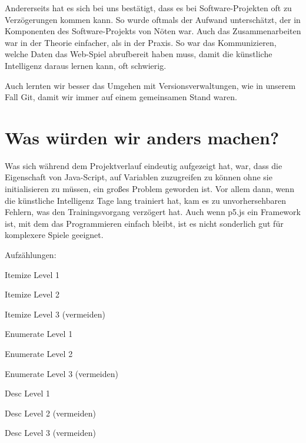 Andererseits hat es sich bei uns bestätigt, dass es bei Software-Projekten oft zu Verzögerungen kommen kann.
So wurde oftmals der Aufwand unterschätzt, der in Komponenten des Software-Projekts von Nöten war. 
Auch das Zusammenarbeiten war in der Theorie einfacher, als in der Praxis. So war das Kommunizieren, welche Daten das Web-Spiel abrufbereit haben muss, damit die künstliche Intelligenz daraus lernen kann, oft schwierig.

Auch lernten wir besser das Umgehen mit Versionsverwaltungen, wie in unserem Fall Git, damit wir immer auf einem gemeinsamen Stand waren.

\section{Was würden wir anders machen?}
Was sich während dem Projektverlauf eindeutig aufgezeigt hat, war, dass die Eigenschaft von Java-Script, auf Variablen zuzugreifen zu können ohne sie initialisieren zu müssen, ein großes Problem geworden ist.
Vor allem dann, wenn die künstliche Intelligenz Tage lang trainiert hat, kam es zu unvorhersehbaren Fehlern, was den Trainingsvorgang verzögert hat. 
Auch wenn p5.js ein Framework ist, mit dem das Programmieren einfach bleibt, ist es nicht sonderlich gut für komplexere Spiele geeignet. 


Aufzählungen:

\begin{compactitem}
    \item Itemize Level 1
    \begin{compactitem}
        \item Itemize Level 2
        \begin{compactitem}
            \item Itemize Level 3 (vermeiden)
        \end{compactitem}
    \end{compactitem}
\end{compactitem}

\begin{compactenum}
    \item Enumerate Level 1
    \begin{compactenum}
        \item Enumerate Level 2
        \begin{compactenum}
            \item Enumerate Level 3 (vermeiden)
        \end{compactenum}
    \end{compactenum}
\end{compactenum}

\begin{compactdesc}
    \item[Desc] Level 1
    \begin{compactdesc}
        \item[Desc] Level 2 (vermeiden)
        \begin{compactdesc}
            \item[Desc] Level 3 (vermeiden)
        \end{compactdesc}
    \end{compactdesc}
\end{compactdesc}